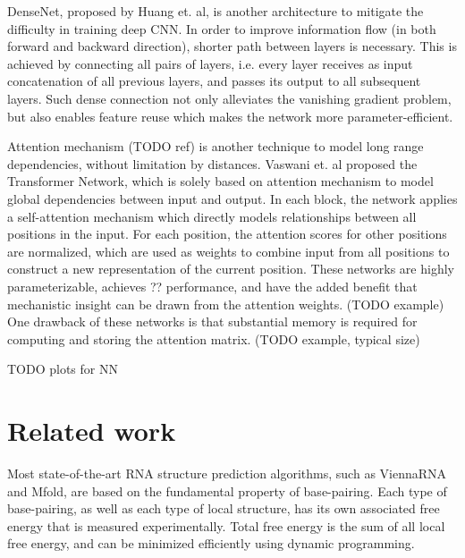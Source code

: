 \documentclass{proposal}
\begin{document}
DenseNet, proposed by Huang et. al\cite{huang2017densely}, is another architecture
to mitigate the difficulty in training deep CNN.
In order to improve information flow (in both forward and backward direction),
shorter path between layers is necessary.
This is achieved by connecting all pairs of layers,
i.e. every layer receives as input concatenation of all previous layers, and passes its output to all subsequent layers.
Such dense connection not only alleviates the vanishing gradient problem, but also enables feature reuse which makes the network more parameter-efficient.



Attention mechanism (TODO ref) is another technique to model long range dependencies,
without limitation by distances.
Vaswani et. al\cite{vaswani2017attention} proposed the Transformer Network,
which is solely based on attention mechanism to model global dependencies between input and output.
In each block, the network applies a self-attention mechanism
which directly models relationships between all positions in the input.
For each position, the attention scores for other positions are normalized,
which are used as weights to combine input from all positions to construct a new representation of the current position.
These networks are highly parameterizable, achieves ?? performance,
and have the added benefit that mechanistic insight can be drawn from the attention weights. (TODO example)
One drawback of these networks is that substantial memory is required for computing and storing the attention matrix.
(TODO example, typical size)


%
%



TODO plots for NN


\section{Related work}

Most state-of-the-art RNA structure prediction algorithms, such as ViennaRNA\cite{lorenz2011viennarna} and Mfold\cite{zuker2003mfold},
are based on the fundamental property of base-pairing.
Each type of base-pairing, as well as each type of local structure, has its own associated free energy that is measured experimentally.
Total free energy is the sum of all local free energy, and can be minimized efficiently using dynamic programming.
\end{document}
